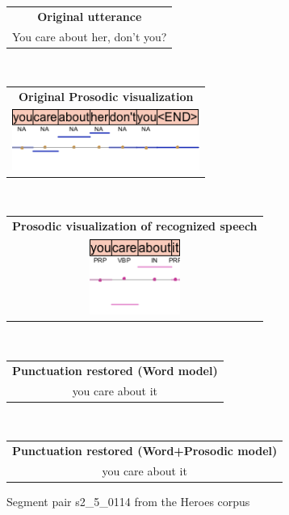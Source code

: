 \hfill
\hfill
\begin{figure}[h]
    \centering
    \begin{tabular}{c}
    \textbf{Original utterance}\\
    You care about her, don't you? \\
    \end{tabular}
    \\
    \begin{tabular}{c}
    \textbf{Original Prosodic visualization}\\
    \includegraphics[height=2cm]{img/s2_5_0114.png} \\
    \end{tabular}
    \\
    \begin{tabular}{c}
    \textbf{Prosodic visualization of recognized speech}\\
    \includegraphics[height=2.5cm]{img/s2_5_0114_asr.png} \\
    \end{tabular}
    \\
    \begin{tabular}{c}
    \textbf{Punctuation restored (Word model)}\\
    you care about it\mycirc{\textbf{.}}  \\
    \end{tabular}
    \\
    \begin{tabular}{c}
    \textbf{Punctuation restored (Word+Prosodic model)}\\
    you care about it\mycirc{\textbf{?}} \\
    \end{tabular}

    \caption{Segment pair s2\_5\_0114 from the Heroes corpus}
    \label{figure:heroes_pp_3}
\end{figure}

